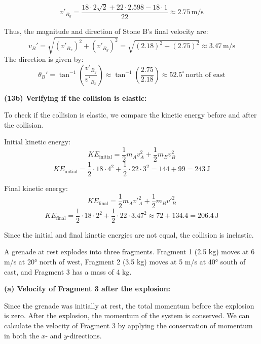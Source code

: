 \documentclass[addpoints]{exam}
\begin{document}
\begin{questions}
\begin{questions}
\begin{solution}[6cm]
\[
v'_{B_y} = \frac{18 \cdot 2\sqrt{2} + 22 \cdot 2.598 - 18 \cdot 1}{22} \approx 2.75 \, \text{m/s}
\]

Thus, the magnitude and direction of Stone B’s final velocity are:
\[
v_B' = \sqrt{(v'_{B_x})^2 + (v'_{B_y})^2} = \sqrt{(2.18)^2 + (2.75)^2} \approx 3.47 \, \text{m/s}
\]
The direction is given by:
\[
\theta_B' = \tan^{-1}\left(\frac{v'_{B_y}}{v'_{B_x}}\right) \approx \tan^{-1}\left(\frac{2.75}{2.18}\right) \approx 52.5^\circ \, \text{north of east}
\]

\textbf{(13b) Verifying if the collision is elastic:}  

To check if the collision is elastic, we compare the kinetic energy before and after the collision.  

Initial kinetic energy:
\[
KE_{\text{initial}} = \frac{1}{2} m_A v_A^2 + \frac{1}{2} m_B v_B^2
\]
\[
KE_{\text{initial}} = \frac{1}{2} \cdot 18 \cdot 4^2 + \frac{1}{2} \cdot 22 \cdot 3^2 = 144 + 99 = 243 \, \text{J}
\]

Final kinetic energy:
\[
KE_{\text{final}} = \frac{1}{2} m_A v'_A^2 + \frac{1}{2} m_B v'_B^2
\]
\[
KE_{\text{final}} = \frac{1}{2} \cdot 18 \cdot 2^2 + \frac{1}{2} \cdot 22 \cdot 3.47^2 \approx 72 + 134.4 = 206.4 \, \text{J}
\]

Since the initial and final kinetic energies are not equal, the collision is inelastic.
\end{solution}


\question A grenade at rest explodes into three fragments. Fragment 1 (2.5 kg) moves at 6 m/s at 20° north of west, Fragment 2 (3.5 kg) moves at 5 m/s at 40° south of east, and Fragment 3 has a mass of 4 kg.
\begin{solution}[6cm]
\textbf{(a) Velocity of Fragment 3 after the explosion:}  

Since the grenade was initially at rest, the total momentum before the explosion is zero. After the explosion, the momentum of the system is conserved. We can calculate the velocity of Fragment 3 by applying the conservation of momentum in both the \(x\)- and \(y\)-directions.


\end{solution}
\end{questions}
\end{questions}
\end{document}
